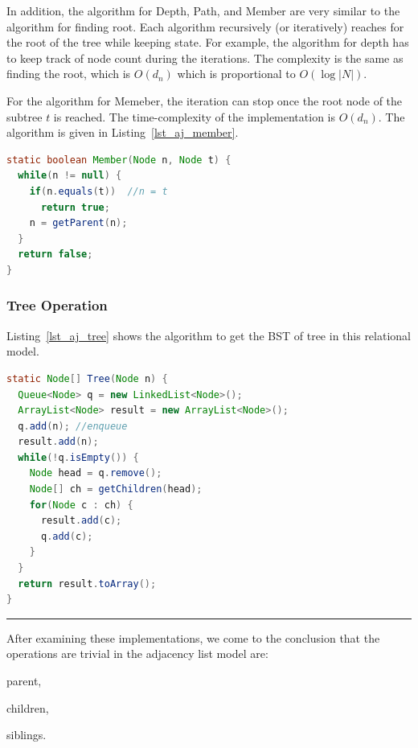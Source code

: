 In addition, the algorithm for Depth, Path, and Member are very similar to the algorithm for finding root. Each algorithm recursively (or iteratively) reaches for the root of the tree while keeping state. For example, the algorithm for depth has to keep track of node count during the iterations. The complexity is the same as finding the root, which is $O(d_n)$ which is proportional to $O(\log |N|)$.

For the algorithm for Memeber, the iteration can stop once the root node of the subtree $t$ is reached. The time-complexity of the implementation is $O(d_n)$. The algorithm is given in Listing~\ref{lst_aj_member}.

\begin{lstlisting}[language=java,caption=Member, label=lst_aj_member, float]
static boolean Member(Node n, Node t) {
  while(n != null) {
    if(n.equals(t))  //n = t
      return true;
    n = getParent(n);
  }
  return false;
}
\end{lstlisting}



\subsubsection{Tree Operation}

Listing~\ref{lst_aj_tree} shows the algorithm to get the BST of tree in this relational model.

\begin{lstlisting}[language=java,caption=Tree via Adjacency List, label=lst_aj_tree, float]
static Node[] Tree(Node n) {
  Queue<Node> q = new LinkedList<Node>();
  ArrayList<Node> result = new ArrayList<Node>();
  q.add(n); //enqueue
  result.add(n);
  while(!q.isEmpty()) {
    Node head = q.remove();
    Node[] ch = getChildren(head);
    for(Node c : ch) {
      result.add(c);
      q.add(c);
    }
  }
  return result.toArray();
}
\end{lstlisting}

\rule{2cm}{0.5pt}

After examining these implementations, we come to the conclusion that the operations are trivial in the adjacency list model are:
\begin{inparaenum}[\itshape 1)]
\item parent,
\item children,
\item siblings.
\end{inparaenum}

